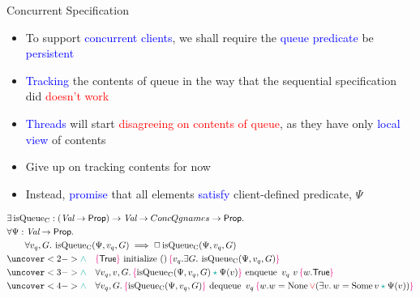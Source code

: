 \documentclass[9pt,xcolor={dvipsnames}]{beamer}
\newcommand{\initialise}{\operatorname{initialize}}
\newcommand{\enqueue}{\operatorname{enqueue}}
\newcommand{\dequeue}{\operatorname{dequeue}}
\newcommand{\isqueueconc}{\operatorname{isQueue_{C}}}
\newcommand{\ConcQgnames}{ConcQgnames}
\newcommand{\vq}{v_q}
\newcommand{\nodeval}{\valB}
\newcommand{\absvalue}{\val}
\newcommand{\Qg}{G}
\newcommand{\concspecinitHTGen}[3]{\hoare{\TRUE}{\initialise \ \TT}{#2 . \Exists #3. \isqueueconc(#1, #2, #3)}}
\newcommand{\concspecinitGen}[3]{\concspecinitHTGen{#1}{#2}{#3}}
\newcommand{\concspecinit}[1]{\concspecinitGen{#1}{\vq}{\Qg}}
\newcommand{\concspecenqHT}[4]{\hoare{\isqueueconc(#1, #2, #4) \star{} #1(#3)}{\enqueue \ #2 \ #3}{\valB . \TRUE}}
\newcommand{\concspecenqGen}[4]{\All #2, #3, #4. \concspecenqHT{#1}{#2}{#3}{#4}}
\newcommand{\concspecenq}[1]{\concspecenqGen{#1}{\vq}{\absvalue}{\Qg}}
\newcommand{\concspecdeqHT}[3]{\hoare{\isqueueconc(#1, #2, #3)}{\dequeue \ #2}{\nodeval . \nodeval = \None \lor{} (\Exists \absvalue . \nodeval = \Some \absvalue \star{} #1(\absvalue))}}
\newcommand{\concspecdeqGen}[3]{\All #2, #3. \concspecdeqHT{#1}{#2}{#3}}
\newcommand{\concspecdeq}[1]{\concspecdeqGen{#1}{\vq}{\Qg}}
\let\oldlor\lor
\renewcommand{\lor}{\begingroup \color{red} \oldlor \endgroup}
\let\oldland\land
\renewcommand{\land}{\begingroup \color{Emerald} \oldland \endgroup}
\let\oldstar\star
\renewcommand{\star}{\begingroup \color{Emerald} \oldstar \endgroup}
\begin{document}
\begin{frame}{Concurrent Specification}
  \begin{itemize}
    \item To support \textcolor{blue}{concurrent clients}, we shall require the \textcolor{blue}{queue predicate} be \textcolor{blue}{persistent}
    \item \textcolor{blue}{Tracking} the contents of queue in the way that the sequential specification did \textcolor{red}{doesn't work}
    \item \textcolor{blue}{Threads} will start \textcolor{red}{disagreeing on contents of queue}, as they have only \textcolor{blue}{local view} of contents
    \item Give up on tracking contents for now
    \item Instead, \textcolor{blue}{promise} that all elements \textcolor{blue}{satisfy} client-defined \textcolor{RubineRed}{predicate}, $\Psi$
  \end{itemize}
  \begin{definition}\label{QueueSpecs:spec:conc}
    \setlength\abovedisplayskip{-8pt}
    \setlength\belowdisplayskip{2pt}
    \fontsize{8pt}{10}\selectfont
    \begin{align*}
      &\Exists \isqueueconc : (\Val \to \Prop) \to \Val \to \ConcQgnames \to \Prop.\\
      &\All \Psi : \Val \to \Prop.\\
      &\quad\quad \All \vq, \Qg . \isqueueconc(\Psi, \vq, \Qg) \implies \persistently \isqueueconc(\Psi, \vq, \Qg)\\
      &\uncover<2->{\land{}\quad\concspecinit{\Psi}}\\
      &\uncover<3->{\land{}\quad\concspecenq{\Psi}}\\
      &\uncover<4->{\land{}\quad\concspecdeq{\Psi}}
    \end{align*}
  \end{definition}
\end{frame}
\end{document}
